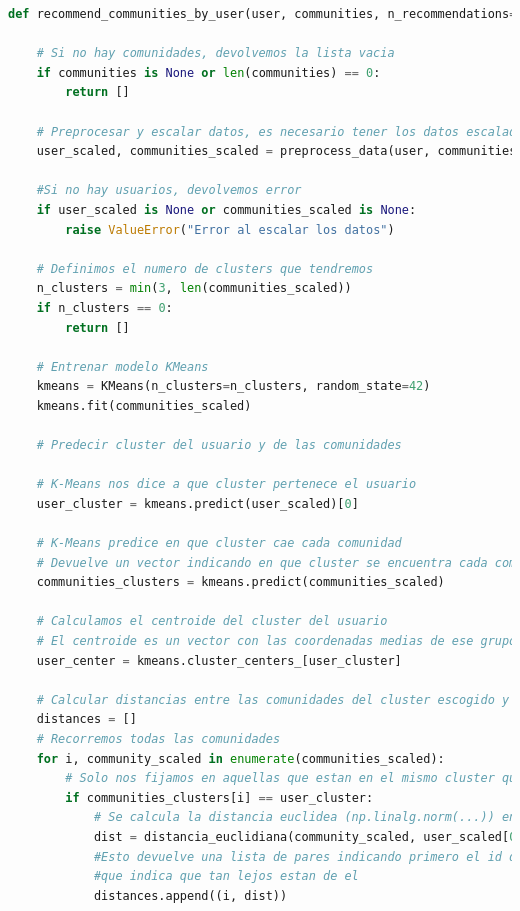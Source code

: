 \begin{lstlisting}[language=Python, caption={Pseudocódigo de la función recommend\_communities\_by\_user}]
def recommend_communities_by_user(user, communities, n_recommendations=10):
    
    # Si no hay comunidades, devolvemos la lista vacia
    if communities is None or len(communities) == 0:
        return []

    # Preprocesar y escalar datos, es necesario tener los datos escalados y en un formato correcto para aplicar K-Means
    user_scaled, communities_scaled = preprocess_data(user, communities)

    #Si no hay usuarios, devolvemos error
    if user_scaled is None or communities_scaled is None:
        raise ValueError("Error al escalar los datos")

    # Definimos el numero de clusters que tendremos
    n_clusters = min(3, len(communities_scaled))
    if n_clusters == 0:
        return []

    # Entrenar modelo KMeans
    kmeans = KMeans(n_clusters=n_clusters, random_state=42)
    kmeans.fit(communities_scaled)

    # Predecir cluster del usuario y de las comunidades

    # K-Means nos dice a que cluster pertenece el usuario
    user_cluster = kmeans.predict(user_scaled)[0]

    # K-Means predice en que cluster cae cada comunidad
    # Devuelve un vector indicando en que cluster se encuentra cada comunidad
    communities_clusters = kmeans.predict(communities_scaled)

    # Calculamos el centroide del cluster del usuario
    # El centroide es un vector con las coordenadas medias de ese grupo
    user_center = kmeans.cluster_centers_[user_cluster]

    # Calcular distancias entre las comunidades del cluster escogido y el centroide del usuario
    distances = []
    # Recorremos todas las comunidades
    for i, community_scaled in enumerate(communities_scaled):
        # Solo nos fijamos en aquellas que estan en el mismo cluster que el usuario
        if communities_clusters[i] == user_cluster:
            # Se calcula la distancia euclidea (np.linalg.norm(...)) entre la comunidad[i} y el usuario
            dist = distancia_euclidiana(community_scaled, user_scaled[0])
            #Esto devuelve una lista de pares indicando primero el id de la comunidad y segundo un valor
            #que indica que tan lejos estan de el
            distances.append((i, dist))


\end{lstlisting}
